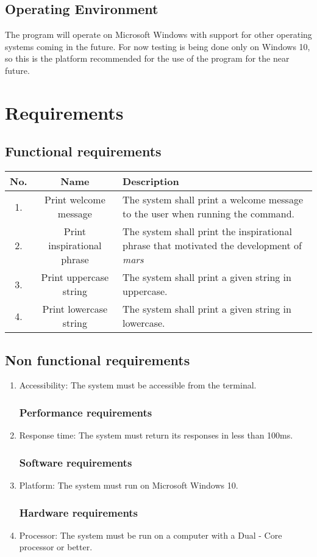 \documentclass{report}
\begin{document}
\section{Operating Environment}
The program will operate on Microsoft Windows with support for other operating systems coming in the future. For now testing is being done only on Windows 10, so this is the platform recommended for the use of the program for the near future.

\chapter{Requirements}
\section{Functional requirements}
\begin{center}
\begin{tabular}{ || c | c | p{7cm} ||}
\hline
No. & Name & Description \\
\hline
1. & Print welcome message & The system shall print a welcome message to the user when running the command. \\
\hline
2. & Print inspirational phrase & The system shall print the inspirational phrase that motivated the development of \emph{mars} \\
\hline
3. & Print uppercase string & The system shall print a given string in uppercase. \\
\hline
4. & Print lowercase string & The system shall print a given string in lowercase. \\
\hline
\end{tabular}
\end{center}
\section{Non functional requirements}
\begin{enumerate}
\subsection{Usability requirements}
\item{Accessibility: The system must be accessible from the terminal.}
\subsection{Performance requirements}
\item{Response time: The system must return its responses in less than 100ms.}
\subsection{Software requirements}
\item{Platform: The system must run on Microsoft Windows 10.}
\subsection{Hardware requirements}
\item{Processor: The system must be run on a computer with a Dual - Core processor or better.}
\end{enumerate}
\end{document}

